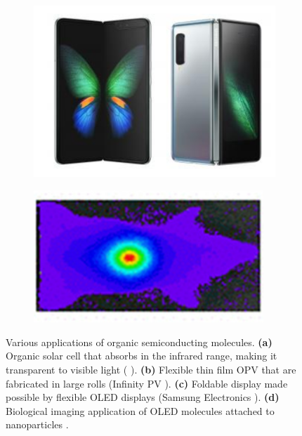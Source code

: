 \begin{figure}[h]
    \begin{subfigure}[t]{.43\textwidth}
        \centering
        \includegraphics[width=\textwidth]{pictures/folding_oled_fold.PNG}
        \caption{}
    \end{subfigure}
    \hspace{0.5cm}
    \begin{subfigure}[t]{.43\textwidth}
        \centering
        \includegraphics[width=0.95\textwidth]{pictures/biological_oled.PNG}
        \caption{}
    \end{subfigure}
    
    
    \caption[Various applications of organic semiconducting molecules. \textbf{(a)} Organic solar cell that absorbs in the infrared range, making it transparent to visible light. \textbf{(b)} Flexible thin film {OPV} that are fabricated in large rolls (Infinity PV). \textbf{(c)} Foldable display made possible by flexible {OLED} displays (Samsung Electronics). \textbf{(d)} Biological imaging application of {OLED} molecules attached to nanoparticles.]{Various applications of organic semiconducting molecules. \textbf{(a)} Organic solar cell that absorbs in the infrared range, making it transparent to visible light (\citeauthor{zhao2014near} \citep{zhao2014near}). \textbf{(b)} Flexible thin film {OPV} that are fabricated in large rolls (Infinity PV \citep{jacobyInfinityPV}). \textbf{(c)} Foldable display made possible by flexible {OLED} displays (Samsung Electronics \citep{galaxyFold}). \textbf{(d)} Biological imaging application of {OLED} molecules attached to nanoparticles \citep{crossley2017post}.  }
    \label{fig:intro:applications}
\end{figure}

